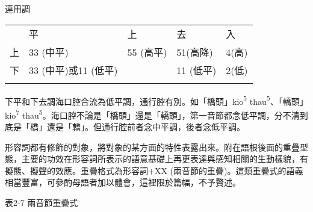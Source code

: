 連用調

\tablefirsthead{}

\tabletail{}
\tablelasttail{}
\begin{tabularx}{\textwidth}{XXXXX} & 平 & 上 & 去 & 入\\
\lsptoprule
上 & 33 (中平) & 55 (高平) & 51(高降) & 4(高)\\
下 & 33 (中平)或11 (低平) &  & 11 (低平) & 2(低)\\
\lspbottomrule
\end{tabularx}
\textrm{下平和下去調海口腔合流為低平調，通行腔有別。如「橋頭」kio}\textrm{\textsuperscript{5}} \textrm{thau}\textrm{\textsuperscript{5}}\textrm{、「轎頭」kio}\textrm{\textsuperscript{7}} \textrm{thau}\textrm{\textsuperscript{5}}\textrm{。海口腔不論是「橋頭」還是「轎頭」，第一音節都念低平調，分不清到底是「橋」還是「轎」。但通行腔前者念中平調，後者念低平調。}

\textrm{形容詞都有修飾的對象，將對象的某方面的特性表露出來。附在語根後面的重疊型態，主要的功效在形容詞所表示的語意基礎上再更表達與感知相關的生動樣貌，有擬態、擬聲的效應。重疊格式為形容詞+XX (兩音節的重疊)}。\textrm{這類重疊式的語義相當豐富，可參酌母語者加以體會，這裡限於篇幅，不予贅述。}

表2-7 兩音節重疊式

\tablefirsthead{}

